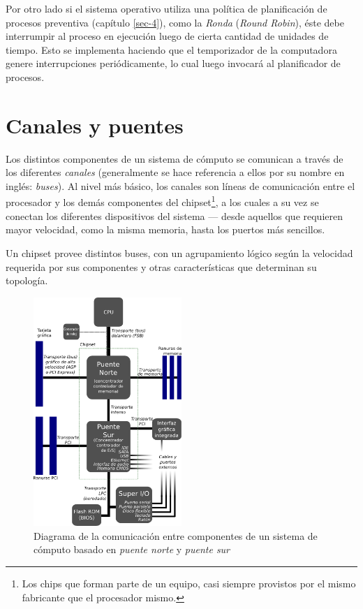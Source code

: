 \documentclass[11pt,fleqn]{book} %
\begin{document}
Por otro lado si el sistema operativo utiliza una política de 
planificación de procesos preventiva (capítulo \ref{sec-4}), 
como la \emph{Ronda} (\emph{Round Robin}),  éste debe interrumpir al proceso
en ejecución luego de cierta cantidad de unidades de tiempo. Esto
se implementa haciendo que el temporizador de la computadora
genere interrupciones periódicamente, lo cual luego invocará al planificador
de procesos.
\section{Canales y puentes}
\label{sec-2-6}


Los distintos componentes de un sistema de cómputo se comunican a
través de los diferentes \emph{canales} (generalmente se hace referencia a
ellos por su nombre en inglés: \emph{buses}). Al nivel más
básico, los canales son líneas de comunicación entre el procesador
y los demás componentes del chipset\footnote{Los chips que forman parte de
un equipo, casi siempre provistos por el mismo fabricante que el
procesador mismo. }, a los cuales a su vez se conectan los diferentes
dispositivos del sistema — desde aquellos que requieren mayor
velocidad, como la misma memoria, hasta los puertos más sencillos.

Un chipset provee distintos buses, con un agrupamiento lógico
según la velocidad requerida por sus componentes y otras
características que determinan su topología.

\begin{figure}[htb]
\centering
\includegraphics[width=0.5\textwidth]{./img/northbridge_southbridge.png}
\caption{\label{HW_northbridge_southbridge}Diagrama de la comunicación entre componentes de un sistema de cómputo basado en \emph{puente norte} y \emph{puente sur}}
\end{figure}
\end{document}
